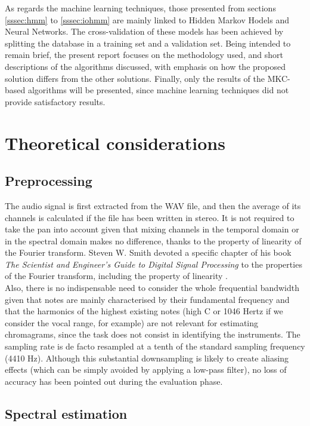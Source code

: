 \documentclass[letterpaper]{article}
\begin{document}
As regards the machine learning techniques, those presented from sections \ref{sssec:hmm} to \ref{sssec:iohmm}
are mainly linked to Hidden Markov Hodels and Neural Networks. The cross-validation of these models has been achieved by splitting
the database in a training set and a validation set. Being intended to remain brief, the present report focuses on the methodology used,
and short descriptions of the algorithms discussed, with emphasis on how the proposed solution differs from the other solutions. Finally, only the results of the MKC-based algorithms will be presented, since machine learning techniques did not provide satisfactory results.

\section{Theoretical considerations}

\subsection{Preprocessing}

The audio signal is first extracted from the WAV file, and then the average of its channels is calculated
if the file has been written in stereo. It is not required to take the pan into account given that mixing
channels in the temporal domain or in the spectral domain makes no difference, thanks to the property of linearity of the Fourier transform.
Steven W. Smith devoted a specific chapter of his book \textit{The Scientist and Engineer's Guide to Digital Signal Processing} to the properties of the Fourier transform, including the property of linearity \citep{PHD}. \\

Also, there is no indispensable need to consider the whole frequential bandwidth given that notes are mainly characterised 
by their fundamental frequency
and that the harmonics of the highest existing notes (high C or 1046 Hertz if we consider the vocal range, for example) are not relevant for estimating chromagrams, since the task does not consist in identifying the instruments.
The sampling rate is de facto resampled at a tenth of the standard sampling frequency (4410 Hz).
Although this substantial downsampling is likely to create aliasing effects (which can be simply avoided by 
applying a low-pass filter), no loss of accuracy has been pointed out during the evaluation phase.

\subsection{Spectral estimation}
\end{document}

